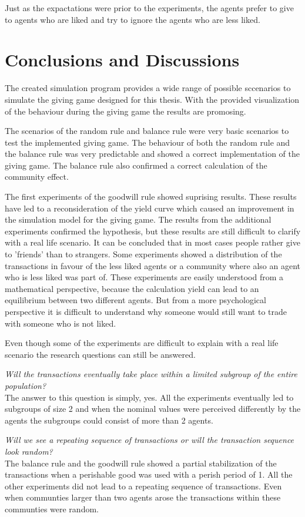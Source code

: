 \documentclass[twoside,openright]{uva-bachelor-thesis}
\begin{document}
Just as the expactations were prior to the experiments, the agents prefer to give to agents who are liked and try to ignore the agents who are less liked.

\chapter{Conclusions and Discussions}
The created simulation program provides a wide range of possible sccenarios to simulate the giving game designed for this thesis. With the provided visualization of the behaviour during the giving game the results are promosing. 

The scenarios of the random rule and balance rule were very basic scenarios to test the implemented giving game. The behaviour of both the random rule and the balance rule was very predictable and showed a correct implementation of the giving game. The balance rule also confirmed a correct calculation of the community effect.

The first experiments of the goodwill rule showed suprising results. These results have led to a reconsideration of the yield curve which caused an improvement in the simulation model for the giving game. The results from the additional experiments confirmed the hypothesis, but these results  are still difficult to clarify with a real life scenario. It can be concluded that in most cases people rather give to 'friends' than to strangers. Some experiments showed a distribution of the transactions in favour of the less liked agents or a community where also an agent who is less liked was part of. These experiments are easily understood from a mathematical perspective, because the calculation yield can lead to an equilibrium between two different agents. But from a more psychological perspective it is difficult to understand why someone would still want to trade with someone who is not liked.

Even though some of the experiments are difficult to explain with a real life scenario the research questions can still be answered.

\textit{Will the transactions eventually take place within a limited subgroup of the entire population?} \\
The answer to this question is simply, yes. All the experiments eventually led to subgroups of size 2 and when the nominal values were perceived differently by the agents the subgroups could consist of more than 2 agents.

\textit{Will we see a repeating sequence of transactions or will the transaction sequence look random?} \\
The balance rule and the goodwill rule showed a partial stabilization of the transactions when a perishable good was used with a perish period of 1. All the other experiments did not lead to a repeating sequence of transactions. Even when communties larger than two agents arose the transactions within these communties were random.
\end{document}
